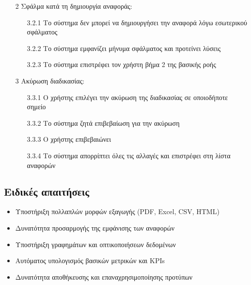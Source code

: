 \documentclass[12pt,a4paper,twoside]{book}
\begin{document}
\begin{enumerate}
  \item[2 ] Σφάλμα κατά τη δημιουργία αναφοράς:
        \begin{enumerate}
          \item[3.2.1 ] Το σύστημα δεν μπορεί να δημιουργήσει την αναφορά λόγω εσωτερικού σφάλματος
          \item[3.2.2 ] Το σύστημα εμφανίζει μήνυμα σφάλματος και προτείνει λύσεις
          \item[3.2.3 ] Το σύστημα επιστρέφει τον χρήστη βήμα 2 της βασικής ροής
        \end{enumerate}
  \item[3 ] Ακύρωση διαδικασίας:
        \begin{enumerate}
          \item[3.3.1 ] Ο χρήστης επιλέγει την ακύρωση της διαδικασίας σε οποιοδήποτε σημείο
          \item[3.3.2 ] Το σύστημα ζητά επιβεβαίωση για την ακύρωση
          \item[3.3.3 ] Ο χρήστης επιβεβαιώνει
          \item[3.3.4 ] Το σύστημα απορρίπτει όλες τις αλλαγές και επιστρέφει στη λίστα αναφορών
        \end{enumerate}
\end{enumerate}

\subsection{Ειδικές απαιτήσεις}
\begin{itemize}
  \item Υποστήριξη πολλαπλών μορφών εξαγωγής (PDF, Excel, CSV, HTML)
  \item Δυνατότητα προσαρμογής της εμφάνισης των αναφορών
  \item Υποστήριξη γραφημάτων και οπτικοποιήσεων δεδομένων
  \item Αυτόματος υπολογισμός βασικών μετρικών και KPIs
  \item Δυνατότητα αποθήκευσης και επαναχρησιμοποίησης προτύπων
\end{itemize}
\end{document}
